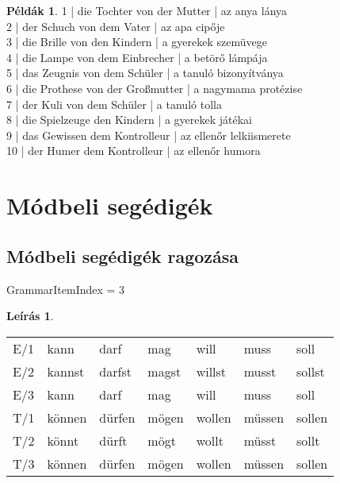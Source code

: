 \documentclass{article}
\theoremstyle{definition}
\newtheorem*{exmp}{Példák}
\newtheorem*{desc}{Leírás}
\begin{document}
\begin{exmp}
1 | die Tochter von der Mutter | az anya lánya\\
2 | der Schuch von dem Vater | az apa cipője\\
3 | die Brille von den Kindern | a gyerekek szemüvege\\
4 | die Lampe von dem Einbrecher | a betörő lámpája\\
5 | das Zeugnis von dem Schüler | a tanuló bizonyítványa\\
6 | die Prothese von der Großmutter | a nagymama protézise\\
7 | der Kuli von dem Schüler | a tanuló tolla\\
8 | die Spielzeuge den Kindern | a gyerekek játékai\\
9 | das Gewissen dem Kontrolleur | az ellenőr lelkiismerete\\
10 | der Humer dem Kontrolleur | az ellenőr humora\\
\end{exmp}

\section{Módbeli segédigék}

\subsection{Módbeli segédigék ragozása}

GrammarItemIndex = 3

\begin{desc}
\begin{tabular}{lllllll}
E/1 & kann & darf & mag & will & muss & soll \\
E/2 & kannst & darfst & magst & willst & musst & sollst \\
E/3 & kann & darf & mag & will & muss & soll \\
T/1 & können & dürfen & mögen & wollen & müssen & sollen \\
T/2 & könnt & dürft & mögt & wollt & müsst & sollt \\
T/3 & können & dürfen & mögen & wollen & müssen & sollen \\
\end{tabular}
\end{desc}
\end{document}
